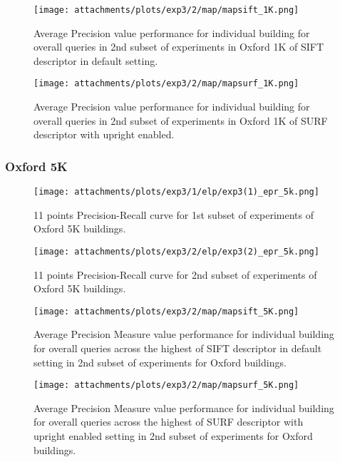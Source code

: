 		\begin{figure}[H]
		    \centering
		    \texttt{[image: attachments/plots/exp3/2/map/mapsift\_1K.png]}
		    \caption{Average Precision value performance for individual building for overall queries in 2nd subset of experiments in Oxford 1K of SIFT descriptor in default setting.}    
		    \label{fig:oxf_exp2_map_sift_1k}
		\end{figure}		
	  
		\begin{figure}[ht!]
		    \centering
		    \texttt{[image: attachments/plots/exp3/2/map/mapsurf\_1K.png]}
		    \caption{Average Precision value performance for individual building for overall queries    in 2nd subset of experiments in Oxford 1K of SURF descriptor with upright enabled.} 
		    \label{fig:oxf_exp2_map_surf_1k}
		\end{figure}		

	\subsubsection{Oxford 5K}\label{ret_ox_5k}
	
		\begin{figure}[H]
		    \centering
		    \texttt{[image: attachments/plots/exp3/1/elp/exp3(1)\_epr\_5k.png]}
		    \caption{11 points Precision-Recall curve for 1st subset of experiments of Oxford 5K buildings.}
		    \label{fig:oxf_exp1_epr_5k}
		\end{figure}

		\begin{figure}[H]
		    \centering
		    \texttt{[image: attachments/plots/exp3/2/elp/exp3(2)\_epr\_5k.png]}
		    \caption{11 points Precision-Recall curve for 2nd subset of experiments of Oxford 5K buildings.}
		    \label{fig:oxf_exp2_epr_5k}
		\end{figure}

	      \begin{figure}[H]
		  \centering
		  \texttt{[image: attachments/plots/exp3/2/map/mapsift\_5K.png]}
		  \caption{Average Precision Measure value performance for individual building for overall queries across the highest of SIFT descriptor in default setting in 2nd subset of experiments for Oxford buildings.}
		  \label{fig:oxf_exp2_map_sift_5k}
	      \end{figure}		
	
	      \begin{figure}[ht!]
		  \centering
		  \texttt{[image: attachments/plots/exp3/2/map/mapsurf\_5K.png]}
		  \caption{Average Precision Measure value performance for individual building for overall queries across the highest of SURF descriptor with upright enabled setting in 2nd subset of experiments for Oxford buildings.}
		  \label{fig:oxf_exp2_map_surf_5k}
	      \end{figure}	
	      
